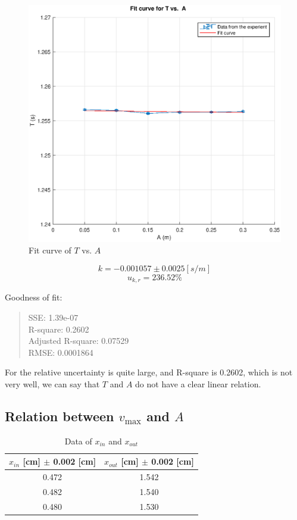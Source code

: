 \begin{figure}[H]
	\centering
	\includegraphics[width=13cm]{matlab/fitfig/a1}
	\caption{Fit curve of $T$ vs. $A$}
\end{figure}

$$ k =  -0.001057 \pm 0.0025  [s/m] $$
$$ u_{k,r} = 236.52 \% $$

Goodness of fit:
\begin{quote}
	\centering
 SSE: 1.39e-07 \\ 
 R-square: 0.2602 \\ 
 Adjusted R-square: 0.07529 \\ 
 RMSE: 0.0001864 \\ 
\end{quote}

For the relative uncertainty is quite large, and R-square is 0.2602, which is not very well,
we can say that $T$ and $A$ do not have a clear linear relation.


\subsection{Relation between $ v_{\max}$ and $A$}

\begin{table}[H]
	\centering
	\begin{tabular}{|c|c|}
	\hline
	$x_{in}$ [cm] $\pm$ 0.002 [cm] & $x_{out}$ [cm] $\pm$ 0.002 [cm]  \\ \hline
	0.472 & 1.542 \\ \hline
	0.482 & 1.540 \\ \hline
	0.480 & 1.530 \\ \hline
	\end{tabular}
	\caption{Data of $x_{in}$ and $x_{out}$}
\label{L_inout}
\end{table}


